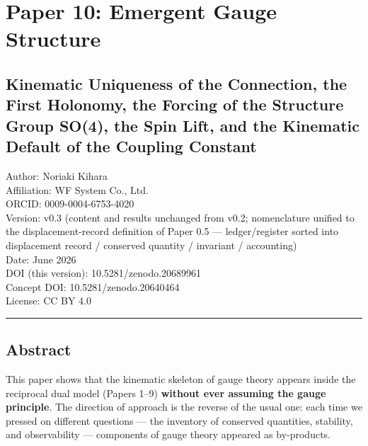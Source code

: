 \documentclass[
]{ltjsarticle}
\author{}
\date{}
\begin{document}
\section{Paper 10: Emergent Gauge
Structure}\label{paper-10-emergent-gauge-structure}

\subsection{Kinematic Uniqueness of the Connection, the First Holonomy,
the Forcing of the Structure Group SO(4), the Spin Lift, and the
Kinematic Default of the Coupling
Constant}\label{kinematic-uniqueness-of-the-connection-the-first-holonomy-the-forcing-of-the-structure-group-so4-the-spin-lift-and-the-kinematic-default-of-the-coupling-constant}

Author: Noriaki Kihara\\
Affiliation: WF System Co., Ltd.\\
ORCID: 0009-0004-6753-4020\\
Version: v0.3 (content and results unchanged from v0.2; nomenclature
unified to the displacement-record definition of Paper 0.5 ---
ledger/register sorted into displacement record / conserved quantity /
invariant / accounting)\\
Date: June 2026\\
DOI (this version): 10.5281/zenodo.20689961\\
Concept DOI: 10.5281/zenodo.20640464\\
License: CC BY 4.0

\begin{center}\rule{0.5\linewidth}{0.5pt}\end{center}

\subsection{Abstract}\label{abstract}

This paper shows that the kinematic skeleton of gauge theory appears
inside the reciprocal dual model (Papers 1--9) \textbf{without ever
assuming the gauge principle}. The direction of approach is the reverse
of the usual one: each time we pressed on different questions --- the
inventory of conserved quantities, stability, and observability ---
components of gauge theory appeared as by-products.
\end{document}
